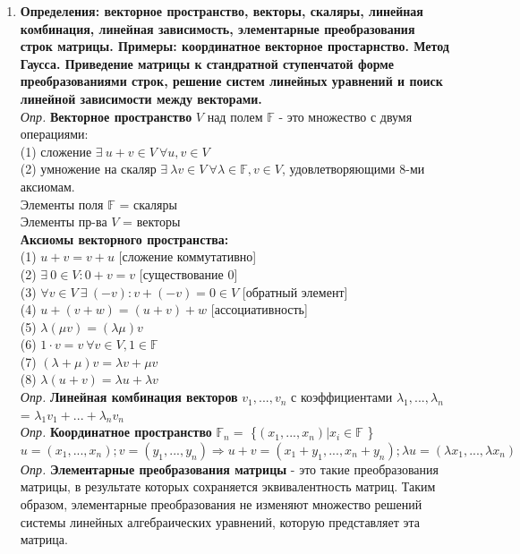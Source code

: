\documentclass[12pt, oneside]{book}
\theoremstyle{definition}
\begin{document}
\begin{enumerate}
\item \textbf{Определения: векторное пространство, векторы, скаляры, линейная комбинация, линейная зависимость, элементарные преобразования строк матрицы. Примеры: координатное векторное простарнство. Метод Гаусса. Приведение матрицы к стандратной ступенчатой форме преобразованиями строк, решение систем линейных уравнений и поиск линейной зависимости между векторами.}\\
\textit{Опр.} \textbf{Векторное пространство} $V$ над полем $\mathbb{F}$ - это множество с двумя операциями: \\
(1) сложение $\exists \ u + v \in V \ \forall u, v \in V $\\
(2) умножение на скаляр $\exists \ \lambda v \in V \ \forall \lambda \in \mathbb{F}, v \in V$, удовлетворяющими 8-ми аксиомам. \\
Элементы поля $\mathbb{F}$ = скаляры \\
Элементы пр-ва $V$ = векторы \\
\textbf{Аксиомы векторного пространства:}\\
(1) $u + v = v + u$ [сложение коммутативно]\\
(2) $\exists \ 0 \in V : 0 + v = v$ [существование 0] \\
(3) $\forall v \in V \ \exists \ (-v) : v + (-v) = 0 \in V$ [обратный элемент] \\
(4) $u + (v + w) = (u + v) + w$ [ассоциативность] \\
(5) $\lambda (\mu v) = (\lambda \mu) v$ \\
(6) $1 \cdot v = v \ \forall v \in V, 1\in \mathbb{F}$\\
(7) $(\lambda + \mu) v = \lambda v + \mu v$ \\
(8) $\lambda(u + v) = \lambda u + \lambda v$ \\
\textit{Опр.} \textbf{Линейная комбинация векторов} $v_1, ... , v_n$ с коэффициентами $\lambda_1, ... , \lambda_n $ = $ \lambda_1 v_1 + ... + \lambda_n v_n$\\
\textit{Опр.} \textbf{Координатное пространство} $\mathbb{F}_n =$ \{$(x_1, ... , x_n) | x_i \in \mathbb{F}$ \} \\
$u = (x_1, ... , x_n); v = (y_1, ... , y_n) \Rightarrow u + v = (x_1 + y_1, ... , x_n + y_n); \lambda u = (\lambda x_1, ... , \lambda x_n)$ \\
\textit{Опр.} \textbf{Элементарные преобразования матрицы} - это такие преобразования матрицы, в результате которых сохраняется эквивалентность матриц. Таким образом, элементарные преобразования не изменяют множество решений системы линейных алгебраических уравнений, которую представляет эта матрица. \\

\end{enumerate}
\end{document}
